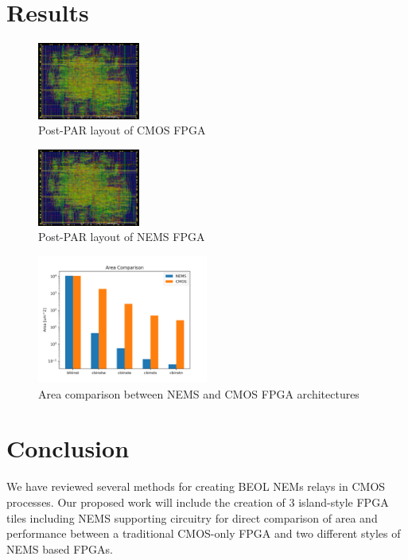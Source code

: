 \documentclass[twoside,twocolumn]{article}
\begin{document}
\section{Results}

\begin{figure}[!hbt]
    \centering
    \caption{Post-PAR layout of CMOS FPGA}
    \label{fig:cmos}
    \includegraphics[width=0.3\textwidth]{figs/cmos_innovus.png}
\end{figure}

\begin{figure}[!hbt]
    \centering
    \caption{Post-PAR layout of NEMS FPGA}
    \label{fig:cmos}
    \includegraphics[width=0.3\textwidth]{figs/cmos_innovus.png}
\end{figure}

\begin{figure}[!hbt]
    \centering
    \caption{Area comparison between NEMS and CMOS FPGA architectures}
    \label{fig:area}
    \includegraphics[width=0.5\textwidth]{figs/area_comparison.png}
\end{figure}



\section{Conclusion}
We have reviewed several methods for creating BEOL NEMs relays in CMOS processes. 
Our proposed work will include the creation of 3 island-style FPGA tiles including NEMS 
supporting circuitry for direct comparison of area and performance between a traditional 
CMOS-only FPGA and two different styles of NEMS based FPGAs.
\end{document}
